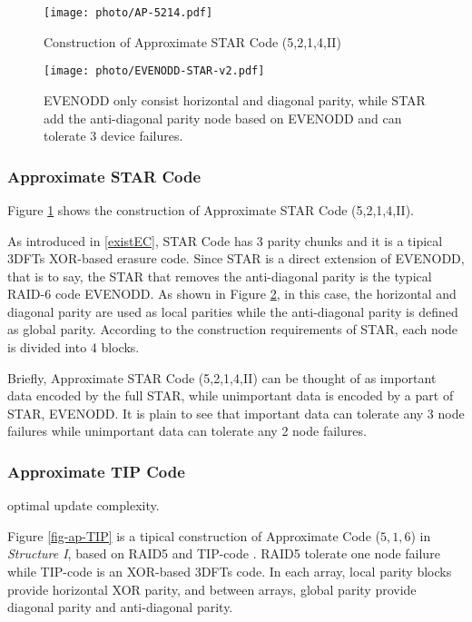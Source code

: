 \documentclass[sigconf]{acmart}
\begin{document}
\begin{figure}[ht]
\centering
\texttt{[image: photo/AP-5214.pdf]}
\caption{Construction of Approximate STAR Code (5,2,1,4,II)}
\label{fig-ap-5214}
\end{figure}

\begin{figure}[ht]
\texttt{[image: photo/EVENODD-STAR-v2.pdf]}
\caption{EVENODD only consist horizontal and diagonal parity, while STAR add the anti-diagonal parity node based on EVENODD and can tolerate 3 device failures.}\label{fig-star}
\end{figure}

\subsubsection{Approximate STAR Code}
Figure \ref{fig-ap-5214} shows the construction of Approximate STAR Code (5,2,1,4,II).

As introduced in \ref{existEC}, STAR Code \cite{STAR} has 3 parity chunks and it is a tipical 3DFTs XOR-based erasure code.
Since STAR is a direct extension of EVENODD\cite{EVENODD}, that is to say, the STAR that removes the anti-diagonal parity is the typical RAID-6 code EVENODD. As shown in Figure \ref{fig-star}, in this case, the horizontal and diagonal parity are used as local parities while the anti-diagonal parity is defined as global parity.
According to the construction requirements of STAR, each node is divided into 4 blocks.

Briefly, Approximate STAR Code (5,2,1,4,II) can be thought of as important data encoded by the full STAR, while unimportant data is encoded by a part of STAR, EVENODD. It is plain to see that important data can tolerate any 3 node failures while unimportant data can tolerate any 2 node failures.

\subsubsection{Approximate TIP Code}

optimal update complexity.

Figure \ref{fig-ap-TIP} is a tipical construction of Approximate Code ($5,1,6$) in \emph{Structure I}, based on RAID5 and TIP-code \cite{tip}. RAID5 tolerate one node failure while TIP-code is an XOR-based 3DFTs code. In each array, local parity blocks provide horizontal XOR parity, and between arrays, global parity provide diagonal parity and anti-diagonal parity. 
\end{document}

